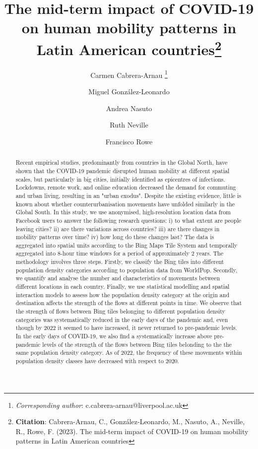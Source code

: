 \documentclass[11pt,letterpaper]{article}
\title{The mid-term impact of COVID-19 on human mobility patterns in Latin American countries\footnote{\textbf{Citation}: Cabrera-Arnau, C., González-Leonardo, M., Nasuto, A., Neville, R., Rowe, F. (2023). The mid-term impact of COVID-19 on human mobility patterns in Latin American countries}}
\author[1]{Carmen Cabrera-Arnau \thanks{\textit{Corresponding author}: c.cabrera-arnau@liverpool.ac.uk}}
\author[2]{Miguel González-Leonardo}
\author[1]{Andrea Nasuto}
\author[1]{Ruth Neville}
\author[1]{Francisco Rowe}
\affil[1]{Geographic Data Science Lab, Department of Geography and Planning, University of Liverpool, Liverpool, United Kingdom}
\affil[2]{Center for Demographic, Urban and Environmental Studies, El Colegio de México (COLMEX), Mexico City, Mexico}
\date{}
\begin{document}
\maketitle


\begin{abstract}

Recent empirical studies, predominantly from countries in the Global North, have shown that the COVID-19 pandemic disrupted human mobility at different spatial scales, but particularly in big cities, initially identified as epicentres of infections. Lockdowns, remote work, and online education decreased the demand for commuting and urban living, resulting in an "urban exodus". Despite the existing evidence, little is known about whether counterurbanisation movements have unfolded similarly in the Global South. In this study, we use anonymised, high-resolution location data from Facebook users to answer the following research questions: i) to what extent are people leaving cities? ii) are there variations across countries? iii) are there changes in mobility patterns over time? iv) how long do these changes last? The data is aggregated into spatial units according to the Bing Maps Tile System and temporally aggregated into 8-hour time windows for a period of approximately 2 years. The methodology involves three steps. Firstly, we classify the Bing tiles into different population density categories according to population data from WorldPop. Secondly, we quantify and analyse the number and characteristics of movements between different locations in each country. Finally, we use statistical modelling and spatial interaction models to assess how the population density category at the origin and destination affects the strength of the flows at different points in time. We observe that the strength of flows between Bing tiles belonging to different population density categories was systematically reduced in the early days of the pandemic and, even though by 2022 it seemed to have increased, it never returned to pre-pandemic levels. In the early days of COVID-19, we also find a systematically increase above pre-pandemic levels of the strength of the flows between Bing tiles belonding to the the same population density category. As of 2022, the frequency of these movements within population density classes have decreased with respect to 2020.

\end{abstract}



\pagebreak






\setlength{\bibsep}{0.00cm plus 0.05cm} %


\end{document}
